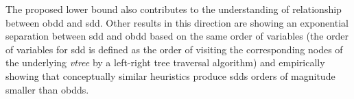 \documentclass{article}
\begin{document}
The proposed lower bound also contributes to the understanding of relationship between {\sc obdd}
and {\sc sdd}. Other results in this direction are \cite{SDDvsOBDD} showing an exponential separation
between {\sc sdd} and {\sc obdd} based on the same order of variables (the order of variables for
{\sc sdd} is defined as the order of visiting the corresponding nodes of the underlying \emph{vtree}
by a left-right tree traversal algorithm) and \cite{DynSDD} empirically showing that conceptually similar 
heuristics produce {\sc sdd}s orders of magnitude smaller than {\sc obdd}s. 

\begin{comment}
{\sc obdd} is a way of representation of Boolean functions that 
is widely used in model checking \cite{OBDD} due to the possibility to efficiently answer a number of 
important queries regarding the properties of these functions. There are many results concerning the space complexity 
of {\sc obdd} representing \emph{particular}
classes of formulas, see e.g. the book \cite{WegBook} and the survey \cite{WegSurvey}. 
In the complexity theory the {\sc obdd} is classified
as the \emph{oblivious read-once branching program}, see the book \cite{Yukna} for the results concerning the
complexity of branching programs on particular classes of formulas. 
\end{comment}
\begin{comment}
It is shown in \cite{VardiTWD} that if the primal graph of a {\sc cnf} has the pathwidth  then there is
an {\sc obdd} of size . In fact the upper bound for the {\sc obdd} size parameterized by the 
treewidth has been obtained by substituting into  the well known upper bound  
for  where  is the treewidth of the primal graph.
\end{comment}
\end{document}
